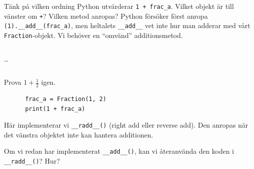 
Tänk på vilken ordning Python utvärderar \texttt{1 + frac_a}. 
Vilket objekt är till vänster om \texttt{+}? Vilken metod anropas?
Python försöker först anropa \texttt{(1).__add__(frac_a)}, men 
heltalets \texttt{__add__} vet inte hur man adderar med vårt 
\texttt{Fraction}-objekt.
Vi behöver en \enquote{omvänd} additionsmetod.

\begin{frame}[fragile]
  \inputminted[linenos,firstline=3,lastline=3]{python}{examples/myfrac_add.py}
  \dots
  \inputminted[autogobble=false,linenos,firstline=41,lastline=43]{python}{examples/myfrac_radd.py}

  \begin{example}
    Prova \(1 + \frac{1}{2}\) igen.
    \begin{verbatim}
      frac_a = Fraction(1, 2)
      print(1 + frac_a)
    \end{verbatim}
  \end{example}
\end{frame}

Här implementerar vi \texttt{__radd__()} (\foreignlanguage{english}{right add} 
eller \foreignlanguage{english}{reverse add}). Den anropas när det vänstra objektet 
inte kan hantera additionen.

\begin{exercise}
  Om vi redan har implementerat \texttt{__add__()}, kan vi återanvända 
  den koden i \texttt{__radd__()}? Hur?
\end{exercise}

